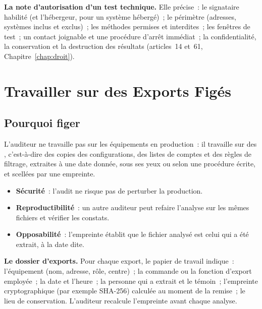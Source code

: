 \begin{boxprocedure}
\textbf{La note d'autorisation d'un test technique.} Elle précise~: le
signataire habilité (et l'hébergeur, pour un système hébergé)~; le
périmètre (adresses, systèmes inclus et exclus)~; les méthodes permises et
interdites~; les fenêtres de test~; un contact joignable et une procédure
d'arrêt immédiat~; la confidentialité, la conservation et la destruction
des résultats (articles~14 et~61, Chapitre~\ref{chap:droit}).
\end{boxprocedure}

\section{Travailler sur des Exports Figés}
\label{sec:c12-exports}

\subsection{Pourquoi figer}

L'auditeur ne travaille pas sur les équipements en production~: il
travaille sur des , c'est-à-dire
des copies des configurations, des listes de comptes et des règles de
filtrage, extraites à une date donnée, sous ses yeux ou selon une procédure
écrite, et scellées par une empreinte.

\begin{itemize}
    \item \textbf{Sécurité}~: l'audit ne risque pas de perturber la
          production.
    \item \textbf{Reproductibilité}~: un autre auditeur peut refaire
          l'analyse sur les mêmes fichiers et vérifier les constats.
    \item \textbf{Opposabilité}~: l'empreinte établit que le fichier analysé
          est celui qui a été extrait, à la date dite.
\end{itemize}

\begin{boxprocedure}
\textbf{Le dossier d'exports.} Pour chaque export, le papier de travail
indique~: l'équipement (nom, adresse, rôle, centre)~; la commande ou la
fonction d'export employée~; la date et l'heure~; la personne qui a extrait
et le témoin~; l'empreinte cryptographique (par exemple SHA-256) calculée
au moment de la remise~; le lieu de conservation. L'auditeur recalcule
l'empreinte avant chaque analyse.
\end{boxprocedure}

